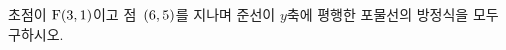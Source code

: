 초점이 $\mathrm{F}(3{,}\mkern3mu\mathopen{}1)$이고 점~$(6{,}\mkern3mu\mathopen{}5)$를 지나며 준선이 $y$축에 평행한 포물선의 방정식을 모두 구하시오.
